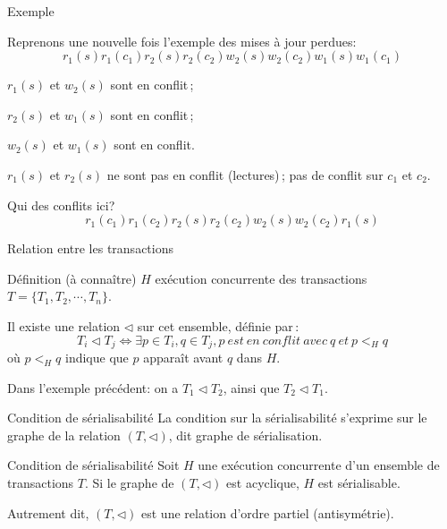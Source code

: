 \begin{frame}{Exemple}

Reprenons une nouvelle fois l'exemple des mises à jour perdues:
$$r_1(s)  r_1(c_1) r_2(s)  r_2(c_2)  w_2(s)  w_2(c_2) w_1(s) w_1(c_1)$$

\begin{redbullet}
  \item $r_1(s)$ et $w_2(s)$ sont en conflit\,;
  \item $r_2(s)$ et $w_1(s)$ sont en conflit\,;
  \item $w_2(s)$ et $w_1(s)$ sont en conflit.
\end{redbullet}

\vfill

 $r_1(s)$ et $r_2(s)$ \alert{ne sont  pas} en conflit (lectures)\,; pas de conflit sur
$c_1$ et $c_2$.

\vfill
\begin{blocgauche}
Qui des conflits ici?
$$r_1(c_1) r_1(c_2) r_2(s)  r_2(c_2)  w_2(s)   w_2(c_2) r_1(s)$$
\end{blocgauche}

\end{frame}


\begin{frame}{Relation entre les transactions}

\begin{defblock}{Définition (à connaître)}
$H$  exécution concurrente des transactions $T = \{T_1, T_2, \cdots, T_n\}$.

Il existe une relation $\lhd$ sur
cet ensemble, définie par\,:
$$T_i \lhd T_j \Leftrightarrow \exists p \in T_i, q \in T_j, p\ est\ en\
conflit\ avec \ q\ et\ p <_H q $$
\noindent
où $p <_H q$ indique que $p$ apparaît avant $q$ dans $H$.
\end{defblock}

\vfill
\begin{blocgauche}
Dans l'exemple précédent: on a  $T_1 \lhd T_2$,
ainsi que $T_2 \lhd T_1$.
\end{blocgauche}
\end{frame}


\begin{frame}{Condition de sérialisabilité}
La condition sur la sérialisabilité
s'exprime sur le graphe de la relation $(T, \lhd)$,
dit
\alert{graphe de sérialisation}.

\vfill


\begin{defblock}{Condition de sérialisabilité}
Soit $H$ une exécution concurrente d'un ensemble de transactions
$T$. Si le graphe de $(T, \lhd)$ est acyclique, $H$ est sérialisable.
\end{defblock}

\vfill

\begin{blocgauche}
Autrement dit, $(T, \lhd)$ est une relation d'ordre partiel (antisymétrie).
\end{blocgauche}
\end{frame}


